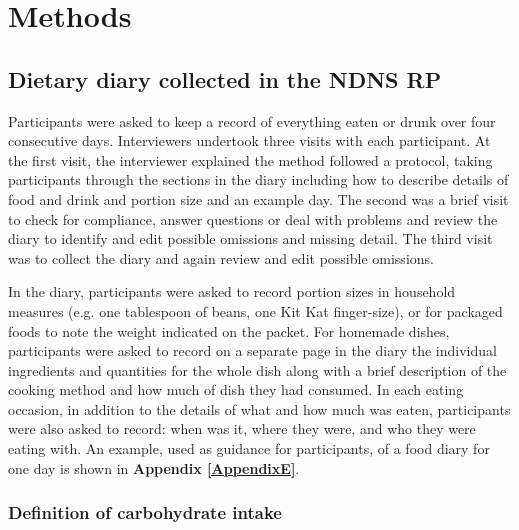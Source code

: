 
\chapter{Methods} %

\label{Chapter 2} %


\section{Dietary diary collected in the NDNS RP}\vspace{-0.3cm}

Participants were asked to keep a record of everything eaten or drunk over four consecutive days. Interviewers undertook three visits with each participant. At the first visit, the interviewer explained the method followed a protocol, taking participants through the sections in the diary including how to describe details of food and drink and portion size and an example day. The second was a brief visit to check for compliance, answer questions or deal with problems and review the diary to identify and edit possible omissions and missing detail. The third visit was to collect the diary and again review and edit possible omissions. 

In the diary, participants were asked to record portion sizes in household measures (e.g. one tablespoon of beans, one Kit Kat finger-size), or for packaged foods to note the weight indicated on the packet. For homemade dishes, participants were asked to record on a separate page in the diary the individual ingredients and quantities for the whole dish along with a brief description of the cooking method and how much of dish they had consumed. In each eating occasion, in addition to the details of what and how much was eaten, participants were also asked to record: when was it, where they were, and who they were eating with. An example, used as guidance for participants, of a food diary for one day is shown in \textbf{Appendix \ref{AppendixE}}.\vspace{-0.3cm}

\subsection{Definition of carbohydrate intake}\vspace{-0.3cm}

